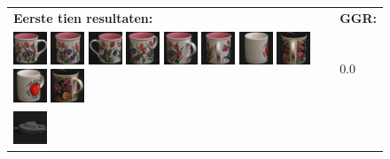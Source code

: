 \begin{figure}[tbp]
\begin{center}
\begin{tabular}{m{11cm} | m{3cm} |}
\textbf{Eerste tien resultaten:} & \textbf{GGR:} \\
\vspace{4pt}
\includegraphics[width=1cm]{coil/beeld-6.eps} 
\includegraphics[width=1cm]{coil/beeld-8.eps} 
\includegraphics[width=1cm]{coil/beeld-7.eps} 
\includegraphics[width=1cm]{coil/beeld-9.eps} 
\includegraphics[width=1cm]{coil/beeld-10.eps} 
\includegraphics[width=1cm]{coil/beeld-11.eps} 
\includegraphics[width=1cm]{coil/beeld-38.eps} 
\includegraphics[width=1cm]{coil/beeld-65.eps} 
\includegraphics[width=1cm]{coil/beeld-39.eps} 
\includegraphics[width=1cm]{coil/beeld-64.eps} & {\scriptsize 0.0} \\ 
\includegraphics[width=1cm]{coil/beeld-24.eps} 

\end{tabular}
\end{center}
\end{figure}
